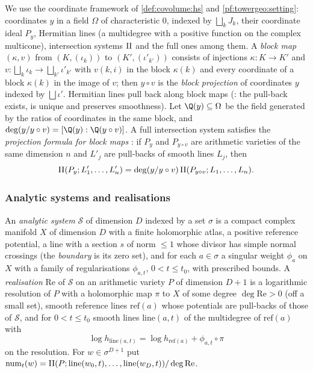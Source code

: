 We use the coordinate framework of \cref{def:covolume:hs} and \cref{pf:towergeo:setting}: coordinates $y$ in a field
$\Omega$ of characteristic $0$, indexed by $\bigsqcup_kJ_k$, their coordinate ideal $P_y$, Hermitian lines (a multidegree
with a positive function on the complex multicone), intersection systems $\mathrm{II}$ and the full ones among them. A
\emph{block map} $(\kappa,v)$ from $(K,(\iota_k))$ to $(K',(\iota'_{k'}))$ consists of injections
$\kappa\colon K\to K'$ and $v\colon\bigsqcup_k\iota_k\to\bigsqcup_{k'}\iota'_{k'}$ with $v(k,i)$ in the block $\kappa(k)$
and every coordinate of a block $\kappa(k)$ in the image of $v$; then $y\circ v$ is the \emph{block projection} of
coordinates $y$ indexed by $\bigsqcup\iota'$. Hermitian lines pull back along block maps
(: the pull-back exists, is unique and preserves smoothness). Let
$\Q(y)\subseteq\Omega$ be the field generated by the ratios of coordinates in the same block, and
$\deg(y/y\circ v)=[\Q(y):\Q(y\circ v)]$. A full intersection system satisfies the \emph{projection formula for block
maps} \cite{GilletSoule1990,BostGilletSoule1994}: if $P_y$ and $P_{y\circ v}$ are arithmetic varieties of the same dimension
$n$ and $L'_j$ are pull-backs of smooth lines $L_j$, then
\begin{equation}\label{pf:tower:eq-pf}
\mathrm{II}(P_y;L'_1,\dots,L'_n)=\deg(y/y\circ v)\,\mathrm{II}(P_{y\circ v};L_1,\dots,L_n).
\end{equation}

\subsubsection*{Analytic systems and realisations}

\begin{definition}\label{pf:tower:def-ansys}
An \emph{analytic system} $\mathcal S$ of dimension $D$ indexed by a set $\sigma$ is a compact complex manifold $X$ of
dimension $D$ with a finite holomorphic atlas, a positive reference potential, a line with a section $s$ of norm $\le1$
whose divisor has simple normal crossings (the \emph{boundary} is its zero set), and for each $a\in\sigma$ a singular weight
$\phi_a$ on $X$ with a family of regularisations $\phi_{a,t}$, $0<t\le t_0$, with prescribed bounds. A \emph{realisation}
$\mathrm{Re}$ of $\mathcal S$ on an arithmetic variety $P$ of dimension $D+1$ is a logarithmic resolution of $P$ with a
holomorphic map $\pi$ to $X$ of some degree $\deg\mathrm{Re}>0$ (off a small set), smooth reference lines $\mathrm{ref}(a)$
whose potentials are pull-backs of those of $\mathcal S$, and for $0<t\le t_0$ smooth lines $\mathrm{line}(a,t)$ of the
multidegree of $\mathrm{ref}(a)$ with
\[
\log h_{\mathrm{line}(a,t)}=\log h_{\mathrm{ref}(a)}+\phi_{a,t}\circ\pi
\]
on the resolution. For $w\in\sigma^{D+1}$ put
$\mathrm{num}_t(w)=\mathrm{II}(P;\mathrm{line}(w_0,t),\dots,\mathrm{line}(w_D,t))/\deg\mathrm{Re}$.
\end{definition}

